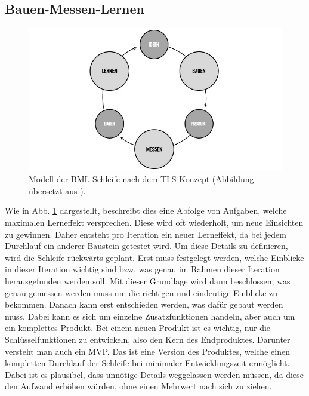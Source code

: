 \subsection*{\label{sec:LeanStartup-BML}\thesubsection\quad Bauen-Messen-Lernen}
\begin{figure}
	\begin{center}
		\includegraphics[scale=0.5]{99_IMG/02_Grundlagen/buildmeasurelearn.jpg}
		\caption[Modell der \ac{BML} Schleife nach dem \ac{TLS}-Konzept.]{Modell der \ac{BML} Schleife nach dem \ac{TLS}-Konzept (Abbildung übersetzt aus ).}
		\label{fig:LeanStartup_BuildMeasureLearn}
	\end{center}
\end{figure}
Wie in Abb. \ref{fig:LeanStartup_BuildMeasureLearn} dargestellt, beschreibt dies eine Abfolge von Aufgaben, welche maximalen Lerneffekt versprechen. Diese wird oft wiederholt, um neue Einsichten zu gewinnen. Daher entsteht pro Iteration ein neuer Lerneffekt, da bei jedem Durchlauf ein anderer Baustein getestet wird. Um diese Details zu definieren, wird die Schleife rückwärts geplant. Erst muss festgelegt werden, welche Einblicke in dieser Iteration wichtig sind bzw. was genau im Rahmen dieser Iteration herausgefunden werden soll. Mit dieser Grundlage wird dann beschlossen, was genau gemessen werden muss um die richtigen und eindeutige Einblicke zu bekommen. Danach kann erst entschieden werden, was dafür gebaut werden muss. Dabei kann es sich um einzelne Zusatzfunktionen handeln, aber auch um ein komplettes Produkt. Bei einem neuen Produkt ist es wichtig, nur die Schlüsselfunktionen zu entwickeln, also den Kern des Endproduktes. Darunter versteht man auch ein \ac{MVP}. Das ist eine Version des Produktes, welche einen kompletten Durchlauf der Schleife bei minimaler Entwicklungszeit ermöglicht. Dabei ist es plausibel, dass unnötige Details weggelassen werden müssen, da diese den Aufwand erhöhen würden, ohne einen Mehrwert nach sich zu ziehen.

